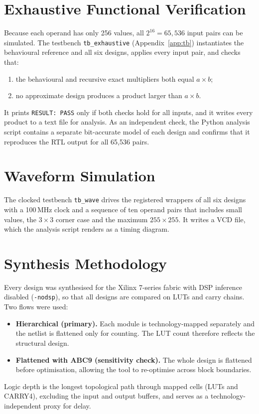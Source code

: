 \documentclass[12pt,a4paper,oneside]{report}
\begin{document}
\section{Exhaustive Functional Verification}
Because each operand has only 256 values, all $2^{16}=65{,}536$ input pairs can be simulated. The testbench \texttt{tb\_exhaustive} (Appendix~\ref{app:tb}) instantiates the behavioural reference and all six designs, applies every input pair, and checks that:
\begin{enumerate}
\item the behavioural and recursive exact multipliers both equal $a\times b$;
\item no approximate design produces a product larger than $a\times b$.
\end{enumerate}
It prints \texttt{RESULT: PASS} only if both checks hold for all inputs, and it writes every product to a text file for analysis. As an independent check, the Python analysis script contains a separate bit-accurate model of each design and confirms that it reproduces the RTL output for all 65{,}536 pairs.

\section{Waveform Simulation}
The clocked testbench \texttt{tb\_wave} drives the registered wrappers of all six designs with a 100\,MHz clock and a sequence of ten operand pairs that includes small values, the $3\times3$ corner case and the maximum $255\times255$. It writes a VCD file, which the analysis script renders as a timing diagram.

\section{Synthesis Methodology}
Every design was synthesised for the Xilinx 7-series fabric with DSP inference disabled (\texttt{-nodsp}), so that all designs are compared on LUTs and carry chains. Two flows were used:
\begin{itemize}
\item \textbf{Hierarchical (primary).} Each module is technology-mapped separately and the netlist is flattened only for counting. The LUT count therefore reflects the structural design.
\item \textbf{Flattened with ABC9 (sensitivity check).} The whole design is flattened before optimisation, allowing the tool to re-optimise across block boundaries.
\end{itemize}
Logic depth is the longest topological path through mapped cells (LUTs and CARRY4), excluding the input and output buffers, and serves as a technology-independent proxy for delay.
\end{document}
